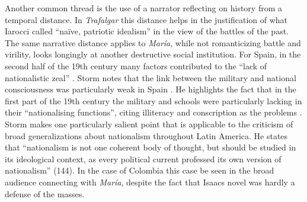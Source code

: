 \documentclass[12pt]{report}
\begin{document}
Another common thread is the use of a narrator reflecting on history from a temporal distance.
In \textit{Trafalgar} this distance helps in the justification of what Iarocci called \enquote{naïve, patriotic idealism} in the view of the battles of the past.
The same narrative distance applies to \textit{María}, while not romanticizing battle and virility, looks longingly at another destructive social institution. 
For Spain, in the second half of the 19th century many factors contributed to the \enquote{lack of nationalistic zeal} \cite[143]{Storm2004}.
Storm notes that the link between the military and national consciousness was particularly weak in Spain \cite[144]{Storm2004}.
He highlights the fact that in the first part of the 19th century the military and schools were particularly lacking in their \enquote{nationalising functions}, citing illiteracy and conscription as the problems \cite[144]{Storm2004}.
Storm makes one particularly salient point that is applicable to the criticism of broad generalizations about nationalism throughout Latin America.
He states that \enquote{nationalism is not one coherent body of thought, but should be studied in its ideological context, as every political current professed its own version of nationalism} (144)\nocite{Storm2004}. 
In the case of Colombia this case be seen in the broad audience connecting with \textit{María}, despite the fact that Isaacs novel was hardly a defense of the masses.
\end{document}
